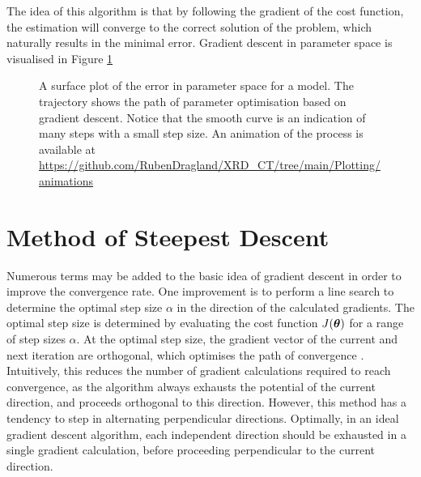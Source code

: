 The idea of this algorithm is that by following the gradient of the cost function,
the estimation will converge to the correct solution of the problem,
which naturally results in the minimal error.
Gradient descent in parameter space is visualised in Figure \ref{fig:GD_surface}

\begin{figure}[h!]
    \centering
    
    \caption[Trajectory of Gradient Descent]{A surface plot of the error in parameter space for a model. The trajectory shows the path of parameter optimisation based on gradient descent.
        Notice that the smooth curve is an indication of many steps with a small step size. An animation of the process is available at \url{https://github.com/RubenDragland/XRD_CT/tree/main/Plotting/animations} %
    }
    \label{fig:GD_surface}
\end{figure}


\section{Method of Steepest Descent}\label{sec:theory_MSD}
Numerous terms may be added to the basic idea of gradient descent in order to improve the convergence rate.
One improvement is to perform a line search to determine the optimal step size $\alpha$ in the direction of the calculated gradients.
The optimal step size is determined by evaluating the cost function $J(\mathrm{\boldsymbol{\theta}})$ for a range of step sizes $\alpha$.
At the optimal step size, the gradient vector of the current and next iteration are orthogonal, which optimises the path of convergence \cite{ruder2016overview}.  %
Intuitively, this reduces the number of gradient calculations required to reach convergence, as the algorithm always exhausts the potential of the current direction, and proceeds orthogonal to this direction.
However, this method has a tendency to step in alternating perpendicular directions. Optimally, in an ideal gradient descent algorithm,
each independent direction should be exhausted in a single gradient calculation, before proceeding perpendicular to the current direction.


